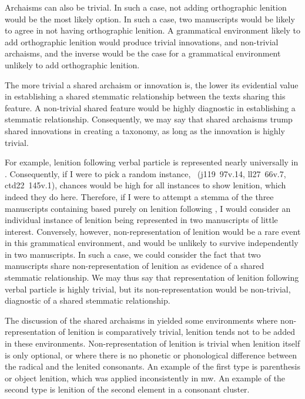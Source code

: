 Archaisms can also be trivial. In such a case, not adding orthographic lenition would be the most likely option. In such a case, two manuscripts would be likely to agree in not having orthographic lenition. A grammatical environment likely to add orthographic lenition would produce trivial innovations, and non-trivial archaisms, and the inverse would be the case for a grammatical environment unlikely to add orthographic lenition.

The more trivial a shared archaism or innovation is, the lower its evidential value in establishing a shared stemmatic relationship between the texts sharing this feature. A non-trivial shared feature would be highly diagnostic in establishing a stemmatic relationship. Consequently, we may say that shared archaisms trump shared innovations in creating a taxonomy, as long as the innovation is highly trivial.

For example, lenition following verbal particle  is represented nearly universally in . Consequently, if I were to pick a random instance, \eg {}~(\gls{j119}~97v.14, \gls{ll27}~66v.7, \gls{ctd22}~145v.1), chances would be high for all instances to show lenition, which indeed they do here. Therefore, if I were to attempt a stemma of the three manuscripts containing  based purely on lenition following , I would consider an individual instance of lenition being represented in two manuscripts of little interest. Conversely, however, non-representation of lenition would be a rare event in this grammatical environment, and would be unlikely to survive independently in two manuscripts. In such a case, we could consider the fact that two manuscripts share non-representation of lenition as evidence of a shared stemmatic relationship. We may thus say that representation of lenition following verbal particle  is highly trivial, but its non-representation would be non-trivial, \ie diagnostic of a shared stemmatic relationship.

The discussion of the shared archaisms in  yielded some environments where non-representation of lenition is comparatively trivial, \ie lenition tends not to be added in these environments. Non-representation of lenition is trivial when lenition itself is only optional, or where there is no phonetic or phonological difference between the radical and the lenited consonants. An example of the first type is parenthesis or object lenition, which was applied inconsistently in \gls{mw}. An example of the second type is lenition of the second element in a  consonant cluster.

